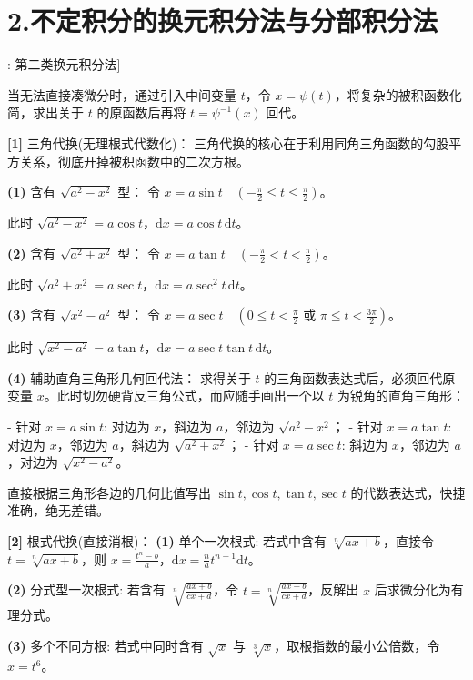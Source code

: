 \documentclass[11pt,a4paper,UTF8]{ctexart}
\begin{document}
\section{2.不定积分的换元积分法与分部积分法}

\begin{thmbox}[方法[1]: 第二类换元积分法]

当无法直接凑微分时，通过引入中间变量 $t$，令 $x = \psi(t)$，将复杂的被积函数化简，求出关于 $t$ 的原函数后再将 $t = \psi^{-1}(x)$ 回代。

\textbf{[1]} 三角代换(无理根式代数化)：
三角代换的核心在于利用同角三角函数的勾股平方关系，彻底开掉被积函数中的二次方根。

\textbf{(1)}  含有 $\sqrt{a^2-x^2}$ 型：
令 $x = a\sin t \quad \left(-\frac{\pi}{2} \leqslant t \leqslant \frac{\pi}{2}\right)$。

此时 $\sqrt{a^2-x^2} = a\cos t$，$\mathrm{d}x = a\cos t\,\mathrm{d}t$。

\textbf{(2)}  含有 $\sqrt{a^2+x^2}$ 型：
令 $x = a\tan t \quad \left(-\frac{\pi}{2} < t < \frac{\pi}{2}\right)$。

此时 $\sqrt{a^2+x^2} = a\sec t$，$\mathrm{d}x = a\sec^2 t\,\mathrm{d}t$。

\textbf{(3)}  含有 $\sqrt{x^2-a^2}$ 型：
令 $x = a\sec t \quad \left(0 \leqslant t < \frac{\pi}{2} \text{ 或 } \pi \leqslant t < \frac{3\pi}{2}\right)$。

此时 $\sqrt{x^2-a^2} = a\tan t$，$\mathrm{d}x = a\sec t\tan t\,\mathrm{d}t$。

\textbf{(4)}  辅助直角三角形几何回代法：
求得关于 $t$ 的三角函数表达式后，必须回代原变量 $x$。此时切勿硬背反三角公式，而应随手画出一个以 $t$ 为锐角的直角三角形：

- 针对 $x = a\sin t$: 对边为 $x$，斜边为 $a$，邻边为 $\sqrt{a^2-x^2}$；
- 针对 $x = a\tan t$: 对边为 $x$，邻边为 $a$，斜边为 $\sqrt{a^2+x^2}$；
- 针对 $x = a\sec t$: 斜边为 $x$，邻边为 $a$，对边为 $\sqrt{x^2-a^2}$。

直接根据三角形各边的几何比值写出 $\sin t, \cos t, \tan t, \sec t$ 的代数表达式，快捷准确，绝无差错。

\textbf{[2]} 根式代换(直接消根)：
\textbf{(1)}  单个一次根式: 若式中含有 $\sqrt[n]{ax+b}$，直接令 $t = \sqrt[n]{ax+b}$，则 $x = \frac{t^n-b}{a}$，$\mathrm{d}x = \frac{n}{a}t^{n-1}\mathrm{d}t$。

\textbf{(2)}  分式型一次根式: 若含有 $\sqrt[n]{\frac{ax+b}{cx+d}}$，令 $t = \sqrt[n]{\frac{ax+b}{cx+d}}$，反解出 $x$ 后求微分化为有理分式。

\textbf{(3)}  多个不同方根: 若式中同时含有 $\sqrt{x}$ 与 $\sqrt[3]{x}$，取根指数的最小公倍数，令 $x = t^6$。


\end{thmbox}
\end{document}
